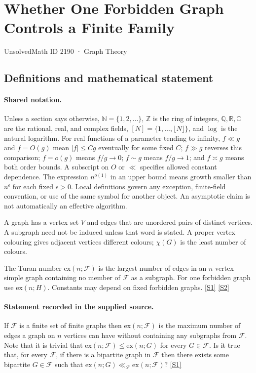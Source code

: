 \documentclass[11pt,a4paper]{article}
\newcommand{\N}{\mathbb{N}}
\newcommand{\Z}{\mathbb{Z}}
\newcommand{\Q}{\mathbb{Q}}
\newcommand{\R}{\mathbb{R}}
\newcommand{\C}{\mathbb{C}}
\newcommand{\sref}[2]{\hyperlink{source:#1:#2}{[S#2]}}
\begin{document}

\setcounter{section}{2189}

\section{Whether One Forbidden Graph Controls a Finite Family}\label{2190}

{\small\sffamily UnsolvedMath ID 2190 · Graph Theory}

\subsection{Definitions and mathematical statement}

\paragraph{Shared notation.}Unless a section says otherwise, $\N=\{1,2,\ldots\}$,
$\Z$ is the ring of integers, $\Q,\R,\C$ are the rational, real, and complex
fields, $[N]=\{1,\ldots,\lfloor N\rfloor\}$, and $\log$ is the natural
logarithm. For real functions of a parameter tending to infinity,
$f\ll g$ and $f=O(g)$ mean $|f|\leq Cg$ eventually for some fixed $C$;
$f\gg g$ reverses this comparison; $f=o(g)$ means $f/g\to0$;
$f\sim g$ means $f/g\to1$; and $f\asymp g$ means both order bounds.
A subscript on $O$ or $\ll$ specifies allowed constant dependence.
The expression $n^{o(1)}$ in an upper bound means growth smaller than
$n^\epsilon$ for each fixed $\epsilon>0$. Local definitions govern any
exception, finite-field convention, or use of the same symbol for another
object. An asymptotic claim is not automatically an effective algorithm.



A graph has a vertex set $V$ and edges that are unordered pairs of distinct vertices. A subgraph need not be induced unless that word is stated. A proper vertex colouring gives adjacent vertices different colours; $\chi(G)$ is the least number of colours.

The Turan number $\mathrm{ex}(n;\mathcal F)$ is the largest number of edges in an $n$-vertex simple graph containing no member of $\mathcal F$ as a subgraph. For one forbidden graph use $\mathrm{ex}(n;H)$. Constants may depend on fixed forbidden graphs. \sref{2190}{1} \sref{2190}{2}

\paragraph{Statement recorded in the supplied source.}
If $\mathcal{F}$ is a finite set of finite graphs then $\mathrm{ex}(n;\mathcal{F})$ is the maximum number of edges a graph on $n$ vertices can have without containing any subgraphs from $\mathcal{F}$. Note that it is trivial that $\mathrm{ex}(n;\mathcal{F})\leq \mathrm{ex}(n;G)$ for every $G\in\mathcal{F}$.
Is it true that, for every $\mathcal{F}$, if there is a bipartite graph in $\mathcal{F}$ then there exists some bipartite $G\in\mathcal{F}$ such that $ \mathrm{ex}(n;G)\ll_{\mathcal{F}}\mathrm{ex}(n;\mathcal{F})? $ \sref{2190}{1}
\end{document}

